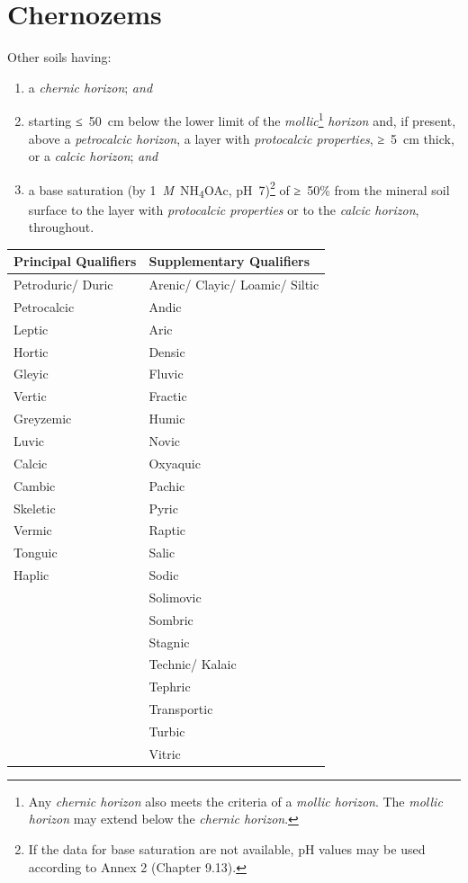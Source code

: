 \documentclass[
  letterpaper,
  DIV=11,
  numbers=noendperiod]{scrreprt}
\providecommand{\tightlist}{%
  \setlength{\itemsep}{0pt}\setlength{\parskip}{0pt}}\usepackage{longtable,booktabs,array}
\begin{document}

\hypertarget{key-chernozems}{%
\chapter{Chernozems}\label{key-chernozems}}

Other soils having:

\begin{enumerate}
\def\labelenumi{\arabic{enumi}.}
\tightlist
\item
  a \emph{chernic horizon}; \emph{and}
\item
  starting ≤~50~cm below the lower limit of the \emph{mollic}\footnote{Any
    \emph{chernic horizon} also meets the criteria of a \emph{mollic
    horizon}. The \emph{mollic horizon} may extend below the
    \emph{chernic horizon}.} \emph{horizon} and, if present, above a
  \emph{petrocalcic horizon}, a layer with \emph{protocalcic
  properties}, ≥~5~cm thick, or a \emph{calcic horizon}; \emph{and}
\item
  a base saturation (by 1~\emph{M}~NH\textsubscript{4}OAc,
  pH~7)\footnote{If the data for base saturation are not available, pH
    values may be used according to Annex 2 (Chapter 9.13).} of ≥~50\%
  from the mineral soil surface to the layer with \emph{protocalcic
  properties} or to the \emph{calcic horizon}, throughout.
\end{enumerate}

\begin{longtable}[]{@{}ll@{}}
\toprule()
Principal Qualifiers & Supplementary Qualifiers \\
\midrule()
\endhead
Petroduric/ Duric & Arenic/ Clayic/ Loamic/ Siltic \\
Petrocalcic & Andic \\
Leptic & Aric \\
Hortic & Densic \\
Gleyic & Fluvic \\
Vertic & Fractic \\
Greyzemic & Humic \\
Luvic & Novic \\
Calcic & Oxyaquic \\
Cambic & Pachic \\
Skeletic & Pyric \\
Vermic & Raptic \\
Tonguic & Salic \\
Haplic & Sodic \\
& Solimovic \\
& Sombric \\
& Stagnic \\
& Technic/ Kalaic \\
& Tephric \\
& Transportic \\
& Turbic \\
& Vitric \\
\bottomrule()
\end{longtable}
\end{document}
